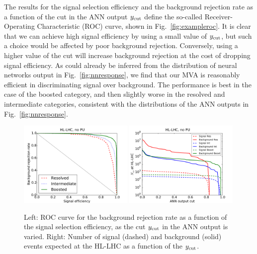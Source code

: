 The results for the signal selection efficiency and the 
background rejection rate as a function of the cut in the ANN output
$y_{\rm cut}$
define the so-called  Receiver-Operating Characteristic (ROC)
curve, shown in Fig.~\ref{fig:exampleroc}.
%
It is clear that we can achieve  high signal efficiency by using
a small value of $y_{\rm cut}$, but such a choice would be
affected by poor background
rejection.
%
Conversely, using a higher value of the cut will increase background rejection at the
cost of dropping signal efficiency.
%
As could already be inferred from the distribution of neural
networks output in Fig.~\ref{fig:nnresponse}, we find
that our MVA is reasonably efficient
in discriminating signal over background.
%
The performance is best in the case of the boosted category,
and then slightly worse in the resolved
and intermediate categories, consistent with the distributions of
the ANN outputs in
Fig.~\ref{fig:nnresponse}.
%

\begin{figure}[t]
\begin{center}
  \includegraphics[width=0.49\textwidth]{plots/roc_noPU.pdf}
  \includegraphics[width=0.49\textwidth]{plots/nev2_noPU.pdf}
\caption{\small Left: ROC curve for the background rejection rate as a function of the signal
  selection efficiency, as the cut $y_{\rm cut}$
  in the ANN output is varied.
  Right: Number of signal (dashed) and background (solid)
  events expected at the HL-LHC as a function of the $y_{\rm cut}$.
}
\label{fig:exampleroc}
\label{fig:nev2}
\end{center}
\end{figure}

